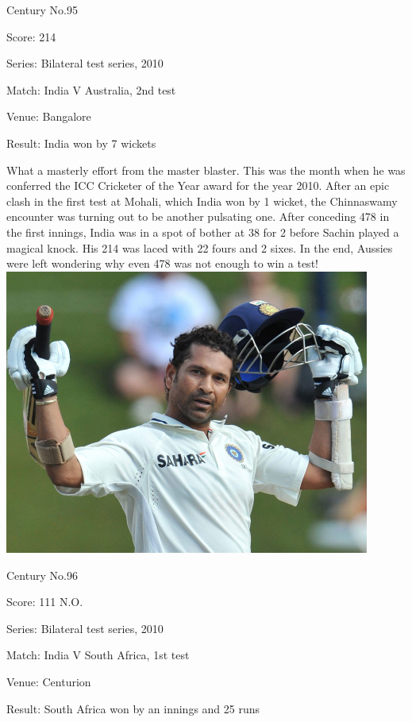 \documentclass[11pt, a4paper]{article}
\begin{document}
Century No.95 

Score: 214 

Series: Bilateral test series, 2010 

Match: India V Australia, 2nd test 

Venue: Bangalore 

Result: India won by 7 wickets 

What a masterly effort from the master blaster. This was the month when he was conferred the ICC Cricketer of the Year award for the year 2010. After an epic clash in the first test at Mohali, which India won by 1 wicket, the Chinnaswamy encounter was turning out to be another pulsating one. After conceding 478 in the first innings, India was in a spot of bother at 38 for 2 before Sachin played a magical knock. His 214 was laced with 22 fours and 2 sixes. In the end, Aussies were left wondering why even 478 was not enough to win a test!
\newpage
\includegraphics[width=0.9\textwidth]{pics/96.jpg}

Century No.96 

Score: 111 N.O. 

Series: Bilateral test series, 2010 

Match: India V South Africa, 1st test 

Venue: Centurion 

Result: South Africa won by an innings and 25 runs 
\end{document}
